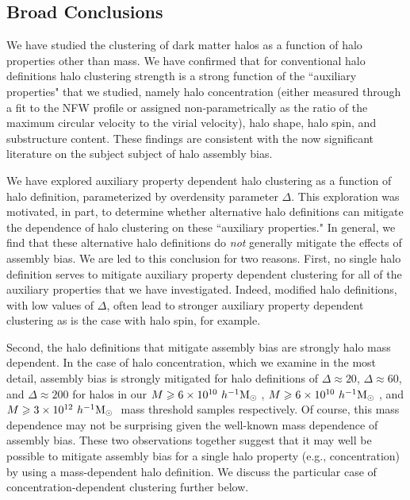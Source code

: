 \documentclass[usenatbib,fleqn]{mnras}
\begin{document}
\subsection{Broad Conclusions}

We have studied the clustering of dark matter halos as a function of halo properties other than mass. We have confirmed that for conventional halo definitions halo clustering strength is a strong function of the  ``auxiliary properties" that we studied, namely halo concentration (either measured through a fit to the NFW profile or assigned non-parametrically as the ratio of the maximum circular velocity to the virial velocity), halo shape, halo spin, and substructure content. These findings are consistent with the now significant literature on the subject subject of halo assembly bias. \citep{peacock_smith00, wechsler_etal02,sheth_tormen04, gao_etal05, zentner_etal05, allgood_etal06, harker_etal06, wechsler_etal06, croton_etal07, zentner07, dalal_etal08, zentner_etal14, mao_etal15, sunayama_etal16}

We have explored auxiliary property dependent halo clustering as a function of halo definition, parameterized by overdensity parameter $\Delta$. This exploration was motivated, in part, to determine whether alternative halo definitions can mitigate the dependence of halo clustering on these ``auxiliary properties." In general, we find that these alternative halo definitions do {\em not} generally mitigate the effects of assembly bias. We are led to this conclusion for two reasons. First, no single halo definition serves to mitigate auxiliary property dependent clustering for all of the auxiliary properties that we have investigated. Indeed, modified halo definitions, with low values of $\Delta$, often lead to stronger auxiliary property dependent clustering as is the case with halo spin, for example.

Second, the halo definitions that mitigate assembly bias are strongly halo mass dependent. In the case of halo concentration, which we examine in the most detail, assembly bias is strongly mitigated for halo definitions of $\Delta \approx 20$, $\Delta \approx 60$, and $\Delta \approx 200$ for halos in our $M \geqslant 6 \times 10^{10} \ h^{-1}\mathrm{M}_{\odot}~$, $M \geqslant 6 \times 10^{10} \ h^{-1}\mathrm{M}_{\odot}~$, and $M \geqslant 3 \times 10^{12} \ h^{-1}\mathrm{M}_{\odot}~$ mass threshold samples respectively. Of course, this mass dependence may not be surprising given the well-known mass dependence of assembly bias. These two observations together suggest that it may well be possible to mitigate assembly bias for a single halo property (e.g., concentration) by using a mass-dependent halo definition. We discuss the particular case of concentration-dependent clustering further below.
\end{document}
